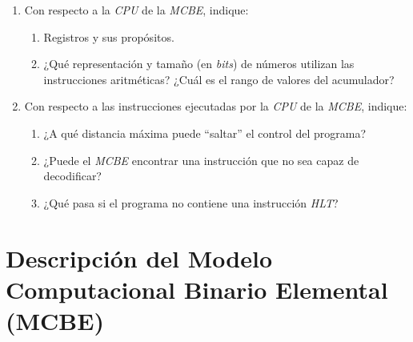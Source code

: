 \documentclass[12pt]{article}
\begin{document}
\begin{enumerate}
    \item Con respecto a la \emph{CPU} de la \emph{MCBE}, indique:

        \begin{enumerate}

            \item Registros y sus propósitos.

            \item ¿Qué representación y tamaño (en \emph{bits}) de números
                utilizan las instrucciones aritméticas? ¿Cuál es el rango de
                valores del acumulador?

        \end{enumerate}

    \item Con respecto a las instrucciones ejecutadas por la \emph{CPU} de la
        \emph{MCBE}, indique:

        \begin{enumerate}

            \item ¿A qué distancia máxima puede ``saltar'' el control del
                programa?

            \item ¿Puede el \emph{MCBE} encontrar una instrucción que no sea
                capaz de decodificar?

            \item ¿Qué pasa si el programa no contiene una instrucción
                \emph{HLT}?

        \end{enumerate}

\end{enumerate}

\appendix
\clearpage
\addappheadtotoc
\appendixpage

\section*{Descripción del Modelo Computacional Binario Elemental (MCBE)}
\end{document}
